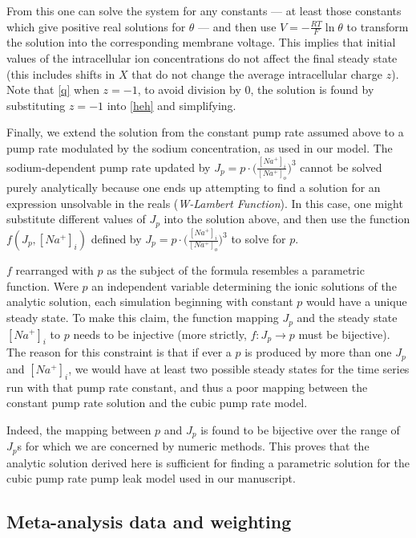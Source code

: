 \documentclass[a4paper,11pt]{article}
\begin{document}
From this one can solve the system for any constants --- at least those constants which give positive real solutions for $\theta$ --- and then use $V=-\frac{RT}{F}\ln{\theta}$ to transform the solution into the corresponding membrane voltage. This implies that initial values of the intracellular ion concentrations do not affect the final steady state (this includes shifts in $X$ that do not change the average intracellular charge $z$). Note that \eqref{q} when $z=-1$, to avoid division by 0, the solution is found by substituting $z=-1$ into \eqref{heh} and simplifying.

Finally, we extend the solution from the constant pump rate assumed above to a pump rate modulated by the sodium concentration, as used in our model. The sodium-dependent pump rate updated by $J_p=p\cdot\Big(\frac{[Na^+]_i}{[Na^+]_o}\Big)^3$ cannot be solved purely analytically because one ends up attempting to find a solution for an expression unsolvable in the reals (\emph{W-Lambert Function}). In this case, one might substitute different values of $J_p$ into the solution above, and then use the function $f(J_p, [Na^+]_i)$ defined by $J_p=p\cdot\Big(\frac{[Na^+]_i}{[Na^+]_o}\Big)^3$ to solve for $p$.

$f$ rearranged with $p$ as the subject of the formula resembles a parametric function. Were $p$ an independent variable determining the ionic solutions of the analytic solution, each simulation beginning with constant $p$ would have a unique steady state. To make this claim, the function mapping $J_p$ and the steady state $[Na^+]_i$ to $p$ needs to be injective (more strictly, $f: J_p\rightarrow p$ must be bijective). The reason for this constraint is that if ever a $p$ is produced by more than one $J_p$ and $[Na^+]_i$, we would have at least two possible steady states for the time series run with that pump rate constant, and thus a poor mapping between the constant pump rate solution and the cubic pump rate model.

Indeed, the mapping between $p$ and $J_p$ is found to be bijective over the range of $J_p$s for which we are concerned by numeric methods. This proves that the analytic solution derived here is sufficient for finding a parametric solution for the cubic pump rate pump leak model used in our manuscript.

\newpage

\subsection*{Meta-analysis data and weighting}
\end{document}
